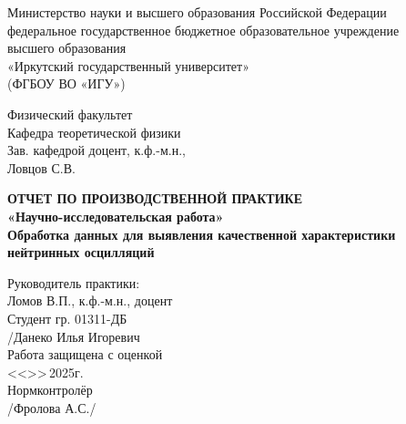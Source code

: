 \documentclass[a4paper,12pt]{article}
\begin{document}
\onehalfspacing
\pagestyle{plain}

\begin{titlepage}
	\begin{center}%
		Министерство науки и высшего образования Российской Федерации\\
		федеральное государственное бюджетное образовательное учреждение\\
		высшего образования \\
		«Иркутский государственный университет»\\
		(ФГБОУ ВО «ИГУ»)\\
	\end{center}
	\vspace*{3em}
	
	\begin{flushright}
		\begin{minipage}{92mm}
			Физический факультет\\
			Кафедра теоретической физики\\
			Зав. кафедрой доцент, к.ф.-м.н.,\\
			Ловцов С.В.\;\underline{\hspace{35mm}}
		\end{minipage}
	\end{flushright}
	\vspace*{4em}
	
	\begin{center}
		\large
		\bfseries%
		ОТЧЕТ ПО ПРОИЗВОДСТВЕННОЙ ПРАКТИКЕ\\
		«Научно-исследовательская работа»\\[2ex]
		
		\Large
		Обработка данных для выявления качественной характеристики нейтринных осцилляций
	\end{center}
	
	\vspace*{3em}
	
	\begin{flushright}
		\begin{minipage}{95mm}
			Руководитель практики:
			\underline{\hspace{35mm}}\\
			Ломов В.П., к.ф.-м.н., доцент\\[3ex]
			Студент гр. 01311-ДБ\\
			\underline{\hspace{35mm}}/Данеко Илья Игоревич\\[3ex]
			Работа защищена с оценкой \underline{\hspace{30mm}}\\
			<<\underline{\hspace{8mm}}>>\underline{\hspace{22mm}}\,2025г.\\
			Нормконтролёр\\
			\underline{\hspace{35mm}}/Фролова А.С./\\
		\end{minipage}
	\end{flushright}
	

\end{titlepage}
\end{document}
